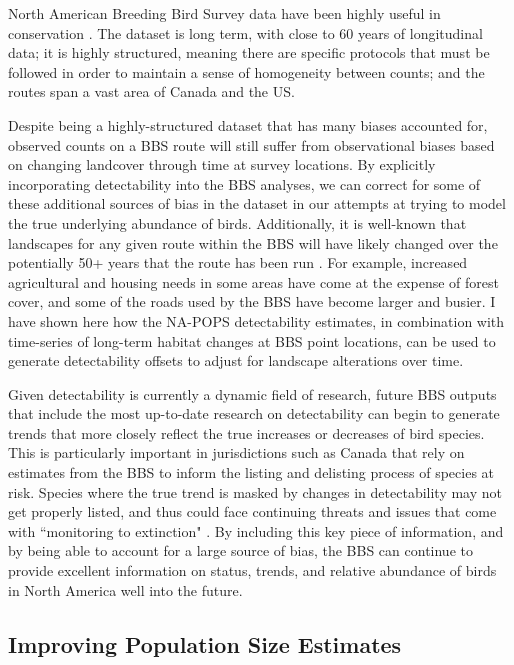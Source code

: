 \par North American Breeding Bird Survey data have been highly useful in conservation \citep{hudson_role_2017}.
The dataset is long term, with close to 60 years of longitudinal data; it is highly structured, meaning there are specific protocols that must be followed in order to maintain a sense of homogeneity between counts; and the routes span a vast area of Canada and the US.

\par Despite being a highly-structured dataset that has many biases accounted for, observed counts on a BBS route will still suffer from observational biases based on changing landcover through time at survey locations.
By explicitly incorporating detectability into the BBS analyses, we can correct for some of these additional sources of bias in the dataset in our attempts at trying to model the true underlying abundance of birds.
Additionally, it is well-known that landscapes for any given route within the BBS will have likely changed over the potentially 50+ years that the route has been run \citep{sauer_first_2017}.
For example, increased agricultural and housing needs in some areas have come at the expense of forest cover, and some of the roads used by the BBS have become larger and busier. 
I have shown here how the NA-POPS detectability estimates, in combination with time-series of long-term habitat changes at BBS point locations, can be used to generate detectability offsets to adjust for landscape alterations over time. 

\par Given detectability is currently a dynamic field of research, future BBS outputs that include the most up-to-date research on detectability can begin to generate trends that more closely reflect the true increases or decreases of bird species.
This is particularly important in jurisdictions such as Canada that rely on estimates from the BBS to inform the listing and delisting process of species at risk.
Species where the true trend is masked by changes in detectability may not get properly listed, and thus could face continuing threats and issues that come with ``monitoring to extinction" \citep{martin_acting_2012, lindenmayer_counting_2013}.
By including this key piece of information, and by being able to account for a large source of bias, the BBS can continue to provide excellent information on status, trends, and relative abundance of birds in North America well into the future.

\subsection{Improving Population Size Estimates}

